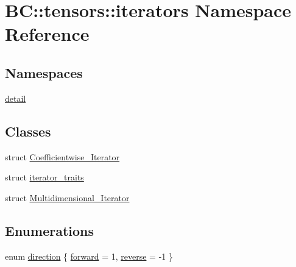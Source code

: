 \hypertarget{namespaceBC_1_1tensors_1_1iterators}{}\section{BC\+:\+:tensors\+:\+:iterators Namespace Reference}
\label{namespaceBC_1_1tensors_1_1iterators}
\subsection*{Namespaces}
\begin{DoxyCompactItemize}
\item 
 \hyperlink{namespaceBC_1_1tensors_1_1iterators_1_1detail}{detail}
\end{DoxyCompactItemize}
\subsection*{Classes}
\begin{DoxyCompactItemize}
\item 
struct \hyperlink{structBC_1_1tensors_1_1iterators_1_1Coefficientwise__Iterator}{Coefficientwise\+\_\+\+Iterator}
\item 
struct \hyperlink{structBC_1_1tensors_1_1iterators_1_1iterator__traits}{iterator\+\_\+traits}
\item 
struct \hyperlink{structBC_1_1tensors_1_1iterators_1_1Multidimensional__Iterator}{Multidimensional\+\_\+\+Iterator}
\end{DoxyCompactItemize}
\subsection*{Enumerations}
\begin{DoxyCompactItemize}
\item 
enum \hyperlink{namespaceBC_1_1tensors_1_1iterators_adbaa579cf4202e9bf262b436879f0f91}{direction} \{ \hyperlink{namespaceBC_1_1tensors_1_1iterators_adbaa579cf4202e9bf262b436879f0f91a5e7a24478cbdf249a43c263afc0c89c4}{forward} = 1, 
\hyperlink{namespaceBC_1_1tensors_1_1iterators_adbaa579cf4202e9bf262b436879f0f91a14a001051152271e89473ad7060e66ca}{reverse} = -\/1
 \}
\end{DoxyCompactItemize}
